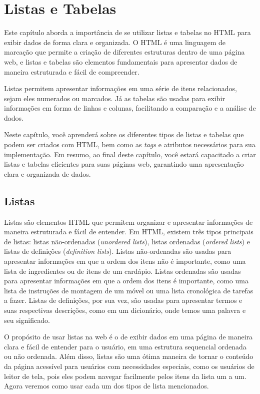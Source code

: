 \chapter{Listas e Tabelas}

Este capítulo aborda a importância de se utilizar listas e tabelas no HTML para exibir dados de forma clara e organizada. O HTML é uma linguagem de marcação que permite a criação de diferentes estruturas dentro de uma página web, e listas e tabelas são elementos fundamentais para apresentar dados de maneira estruturada e fácil de compreender.

Listas permitem apresentar informações em uma série de itens relacionados, sejam eles numerados ou marcados. Já as tabelas são usadas para exibir informações em forma de linhas e colunas, facilitando a comparação e a análise de dados.

Neste capítulo, você aprenderá sobre os diferentes tipos de listas e tabelas que podem ser criados com HTML, bem como as \textit{tags} e atributos necessários para sua implementação. Em resumo, ao final deste capítulo, você estará capacitado a criar listas e tabelas eficientes para suas páginas web, garantindo uma apresentação clara e organizada de dados.

\section{Listas}

Listas são elementos HTML que permitem organizar e apresentar informações de maneira estruturada e fácil de entender. Em HTML, existem três tipos principais de listas: listas não-ordenadas (\textit{unordered lists}), listas ordenadas (\textit{ordered lists}) e listas de definições (\textit{definition lists}). Listas não-ordenadas são usadas para apresentar informações em que a ordem dos itens não é importante, como uma lista de ingredientes ou de itens de um cardápio. Listas ordenadas são usadas para apresentar informações em que a ordem dos itens é importante, como uma lista de instruções de montagem de um móvel ou uma lista cronológica de tarefas a fazer. Listas de definições, por sua vez, são usadas para apresentar termos e suas respectivas descrições, como em um dicionário, onde temos uma palavra e seu significado.

O propósito de usar listas na web é o de exibir dados em uma página de maneira clara e fácil de entender para o usuário, em uma estrutura sequencial ordenada ou não ordenada. Além disso, listas são uma ótima maneira de tornar o conteúdo da página acessível para usuários com necessidades especiais, como os usuários de leitor de tela, pois eles podem navegar facilmente pelos itens da lista um a um. Agora veremos como usar cada um dos tipos de lista mencionados.

